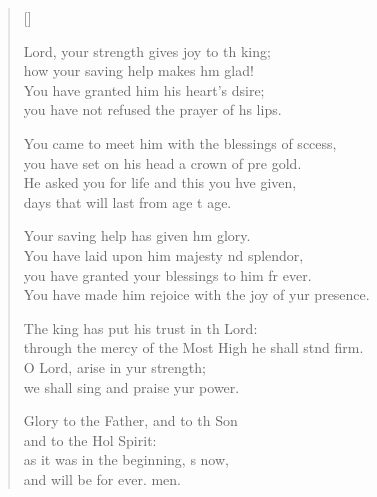 \settowidth{\versewidth}{You have made him rejoice with the joy of your presence.}
\begin{verse}[\versewidth]
  \begin{patverse}
 Lord, your strength gives joy to th king;\Med\\
how your saving help makes h\pointup{\i}m glad!\\
You have granted him his heart’s dsire;\Med\\
you have not refused the prayer of h\pointup{\i}s lips.

You came to meet him with the blessings of sccess,\Med\\
you have set on his head a crown of pre gold.\\
He asked you for life and this you hve given,\Med\\
days that will last from age t age.

Your saving help has given h\pointup{\i}m glory.\Med\\
You have laid upon him majesty nd splendor,\\
you have granted your blessings to him fr ever.\Med\\
You have made him rejoice with the joy of yur presence.

The king has put his trust in th Lord:\Med\\
through the mercy of the Most High he shall stnd firm.\\
O Lord, arise in yur strength;\Med\\
we shall sing and praise yur power.

Glory to the Father, and to th Son\Med\\
and to the Hol Spirit:\\
as it was in the beginning, \pointup{\i}s now,\Med\\
and will be for ever. men.
  \end{patverse}
\end{verse}

